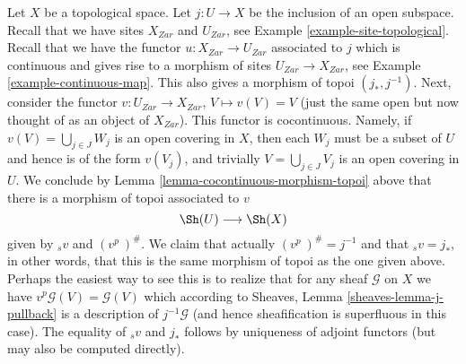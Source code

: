 \begin{example}
\label{example-open-immersion-cocontinuous}
Let $X$ be a topological space.
Let $j : U  \to X$ be the inclusion of an open subspace.
Recall that we have sites $X_{Zar}$ and $U_{Zar}$,
see Example \ref{example-site-topological}.
Recall that we have the functor $u : X_{Zar} \to U_{Zar}$
associated to $j$ which is continuous and gives rise
to a morphism of sites $U_{Zar} \to X_{Zar}$,
see Example \ref{example-continuous-map}.
This also gives a morphism of topoi $(j_*, j^{-1})$.
Next, consider the functor
$v : U_{Zar} \to X_{Zar}$, $V \mapsto v(V) = V$
(just the same open but now thought of as an object of $X_{Zar}$).
This functor is cocontinuous. Namely, if $v(V) = \bigcup_{j \in J} W_j$
is an open covering in $X$, then each $W_j$ must be a subset of
$U$ and hence is of the form $v(V_j)$,
and trivially $V = \bigcup_{j \in J} V_j$ is an open covering in $U$.
We conclude by Lemma \ref{lemma-cocontinuous-morphism-topoi} above
that there is a morphism of topoi associated to $v$
$$
\Sh(U) \longrightarrow \Sh(X)
$$
given by ${}_sv$ and $(v^p\ )^\#$. We claim that
actually $(v^p\ )^\# = j^{-1}$ and that ${}_sv = j_*$,
in other words, that this is the same morphism of topoi
as the one given above. Perhaps the easiest way to see
this is to realize that for any sheaf
$\mathcal{G}$ on $X$ we have
$v^p\mathcal{G}(V) = \mathcal{G}(V)$ which according to
Sheaves, Lemma \ref{sheaves-lemma-j-pullback} is a description
of $j^{-1}\mathcal{G}$ (and hence sheafification is superfluous
in this case). The equality of ${}_sv$ and $j_*$ follows by
uniqueness of adjoint functors (but may also be computed directly).
\end{example}

